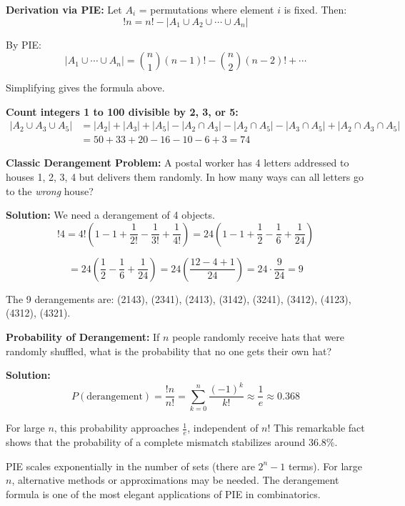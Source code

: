 \documentclass[12pt]{extarticle}
\begin{document}
\textbf{Derivation via PIE:} Let $A_i$ = permutations where element $i$ is fixed. Then:
\[
!n = n! - |A_1 \cup A_2 \cup \cdots \cup A_n|
\]

By PIE:
\[
|A_1 \cup \cdots \cup A_n| = \binom{n}{1}(n-1)! - \binom{n}{2}(n-2)! + \cdots
\]

Simplifying gives the formula above.

\begin{examplebox}
\textbf{Count integers 1 to 100 divisible by 2, 3, or 5:}
\begin{align*}
|A_2 \cup A_3 \cup A_5| &= |A_2| + |A_3| + |A_5| - |A_2 \cap A_3| - |A_2 \cap A_5| - |A_3 \cap A_5| + |A_2 \cap A_3 \cap A_5| \\
&= 50 + 33 + 20 - 16 - 10 - 6 + 3 = 74
\end{align*}
\end{examplebox}

\begin{examplebox}
\textbf{Classic Derangement Problem:} A postal worker has 4 letters addressed to houses 1, 2, 3, 4 but delivers them randomly. In how many ways can all letters go to the \textit{wrong} house?

\textbf{Solution:} We need a derangement of 4 objects.
\[
!4 = 4!\left(1 - 1 + \frac{1}{2!} - \frac{1}{3!} + \frac{1}{4!}\right) = 24\left(1 - 1 + \frac{1}{2} - \frac{1}{6} + \frac{1}{24}\right)
\]

\[
= 24\left(\frac{1}{2} - \frac{1}{6} + \frac{1}{24}\right) = 24\left(\frac{12 - 4 + 1}{24}\right) = 24 \cdot \frac{9}{24} = 9
\]

The 9 derangements are: (2143), (2341), (2413), (3142), (3241), (3412), (4123), (4312), (4321).
\end{examplebox}

\begin{examplebox}
\textbf{Probability of Derangement:} If $n$ people randomly receive hats that were randomly shuffled, what is the probability that no one gets their own hat?

\textbf{Solution:} 
\[
P(\text{derangement}) = \frac{!n}{n!} = \sum_{k=0}^{n} \frac{(-1)^k}{k!} \approx \frac{1}{e} \approx 0.368
\]

For large $n$, this probability approaches $\frac{1}{e}$, independent of $n$! This remarkable fact shows that the probability of a complete mismatch stabilizes around 36.8\%.
\end{examplebox}

\begin{remarkbox}
PIE scales exponentially in the number of sets (there are $2^n - 1$ terms). For large $n$, alternative methods or approximations may be needed. The derangement formula is one of the most elegant applications of PIE in combinatorics.
\end{remarkbox}
\newpage
\end{document}
